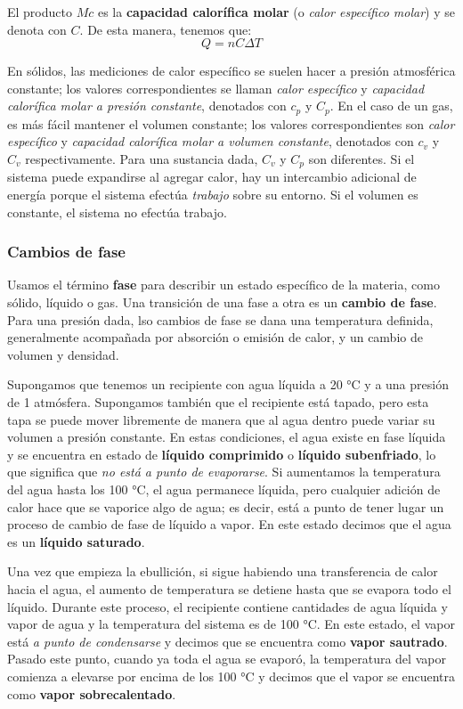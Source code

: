 \documentclass[12pt]{article}
\begin{document}
  El producto $ Mc $ es la \textbf{capacidad calorífica molar} (o \textit{calor específico molar}) y se denota con $ C $. De esta manera, tenemos que:
  \[
  Q = nC\Delta T
  \]

  En sólidos, las mediciones de calor específico se suelen hacer a presión atmosférica constante; los valores correspondientes se llaman \textit{calor específico} y \textit{capacidad calorífica molar a presión constante}, denotados con $ c_{p} $ y $ C_{p} $. En el caso de un gas, es más fácil mantener el volumen constante; los valores correspondientes son \textit{calor específico} y \textit{capacidad calorífica molar a volumen constante}, denotados con $ c_{v} $ y $ C_{v} $ respectivamente. Para una sustancia dada, $ C_{v} $ y $ C_{p} $ son diferentes. Si el sistema puede expandirse al agregar calor, hay un intercambio adicional de energía porque el sistema efectúa \textit{trabajo} sobre su entorno. Si el volumen es constante, el sistema no efectúa trabajo. 

  \subsubsection{Cambios de fase}
  Usamos el término \textbf{fase} para describir un estado específico de la materia, como sólido, líquido o gas. Una transición de una fase a otra es un \textbf{cambio de fase}. Para una presión dada, lso cambios de fase se dana una temperatura definida, generalmente acompañada por absorción o emisión de calor, y un cambio de volumen y densidad.

  Supongamos que tenemos un recipiente con agua líquida a 20 °C y a una presión de 1 atmósfera. Supongamos también que el recipiente está tapado, pero esta tapa se puede mover libremente de manera que al agua dentro puede variar su volumen a presión constante. En estas condiciones, el agua existe en fase líquida y se encuentra en estado de \textbf{líquido comprimido} o \textbf{líquido subenfriado}, lo que significa que \textit{no está a punto de evaporarse}. Si aumentamos la temperatura del agua hasta los 100 °C, el agua permanece líquida, pero cualquier adición de calor hace que se vaporice algo de agua; es decir, está a punto de tener lugar un proceso de cambio de fase de líquido a vapor. En este estado decimos que el agua es un \textbf{líquido saturado}. 

  Una vez que empieza la ebullición, si sigue habiendo una transferencia de calor hacia el agua, el aumento de temperatura se detiene hasta que se evapora todo el líquido. Durante este proceso, el recipiente contiene cantidades de agua líquida y vapor de agua y la temperatura del sistema es de 100 °C. En este estado, el vapor está \textit{a punto de condensarse} y decimos que  se encuentra como \textbf{vapor sautrado}. Pasado este punto, cuando ya toda el agua se evaporó, la temperatura del vapor comienza a elevarse por encima de los 100 °C y decimos que el vapor se encuentra como \textbf{vapor sobrecalentado}.
\end{document}
